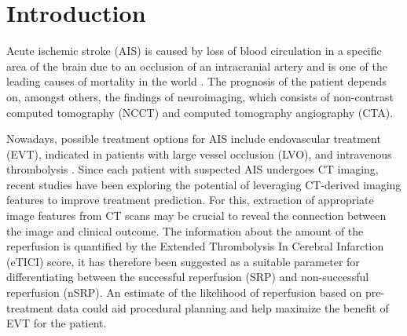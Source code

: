 \documentclass[preprint,12pt]{elsarticle}
\begin{document}

\section{Introduction}
\label{sec1}


Acute ischemic stroke (AIS) is caused by loss of blood circulation in a specific area of the brain due to an occlusion of an intracranial artery and is one of the leading causes of mortality in the world \cite{Phipps2020}. The prognosis of the patient depends on, amongst others, the findings of neuroimaging, which consists of non-contrast computed tomography (NCCT) and computed tomography angiography (CTA).

Nowadays, possible treatment options for AIS include endovascular treatment (EVT), indicated in patients with large vessel occlusion (LVO), and intravenous thrombolysis \cite{Powers2020}. Since each patient with suspected AIS undergoes CT imaging, recent studies have been exploring the potential of leveraging CT-derived imaging features to improve treatment prediction. For this, extraction of appropriate image features from CT scans may be crucial to reveal the connection between the image and clinical outcome. The information about the amount of the reperfusion is quantified by the Extended Thrombolysis In Cerebral Infarction (eTICI) score, it has therefore been suggested as a suitable parameter for differentiating between the successful reperfusion (SRP) and non-successful reperfusion (nSRP). An estimate of the likelihood of reperfusion based on pre-treatment data could aid procedural planning and help maximize the benefit of EVT for the patient.

\end{document}
